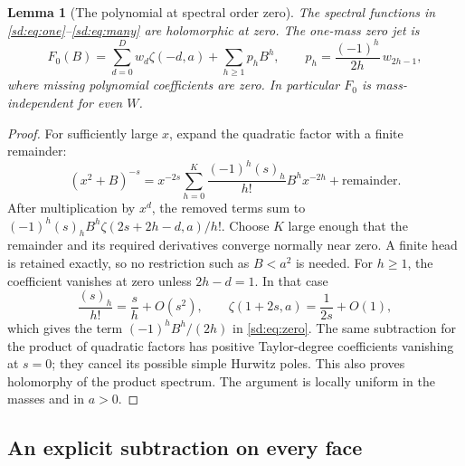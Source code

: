 \documentclass[11pt,a4paper]{article}
\numberwithin{equation}{section}
\newtheorem{lemma}[theorem]{Lemma}
\theoremstyle{definition}
\theoremstyle{remark}
\begin{document}
\begin{lemma}[The polynomial at spectral order zero]
\label{sd:lem:zero}
The spectral functions in \eqref{sd:eq:one}--\eqref{sd:eq:many} are
holomorphic at zero.  The one-mass zero jet is
\begin{equation}\label{sd:eq:zero}
 F_0(B)=\sum_{d=0}^{D}w_d\zeta(-d,a)
           +\sum_{h\ge1}p_h B^h,\qquad
 p_h=\frac{(-1)^h}{2h}\,w_{2h-1},
\end{equation}
where missing polynomial coefficients are zero.  In particular $F_0$
is mass-independent for even $W$.
\end{lemma}
\begin{proof}
For sufficiently large $x$, expand the quadratic factor with a finite
remainder:
\[
 (x^2+B)^{-s}=x^{-2s}\sum_{h=0}^{K}
                 \frac{(-1)^h(s)_h}{h!}B^h x^{-2h}
                  +\text{remainder}.
\]
After multiplication by $x^d$, the removed terms sum to
$(-1)^h(s)_hB^h\zeta(2s+2h-d,a)/h!$.  Choose $K$ large enough
that the remainder and its required derivatives converge normally near
zero.  A finite head is retained exactly, so no restriction such as
$B<a^2$ is needed.  For $h\ge1$, the coefficient vanishes at zero
unless $2h-d=1$.  In that case
\[
 \frac{(s)_h}{h!}=\frac{s}{h}+O(s^2),\qquad
 \zeta(1+2s,a)=\frac1{2s}+O(1),
\]
which gives the term $(-1)^h B^h/(2h)$ in \eqref{sd:eq:zero}.
The same subtraction for the product of quadratic factors has positive
Taylor-degree coefficients vanishing at $s=0$; they cancel its possible
simple Hurwitz poles.  This also proves holomorphy of the product
spectrum.  The argument is locally uniform in the masses and in $a>0$.
\end{proof}

\subsection{An explicit subtraction on every face}
\label{sd:subsec:faces}
\end{document}
